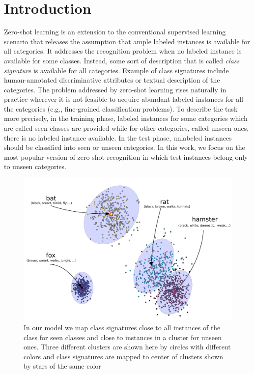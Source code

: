 \documentclass[letterpaper]{article}
\begin{document}
\section{Introduction}
Zero-shot learning \cite{bengio08,hinton09,lampert09,farhadi09} is an extension to the conventional supervised learning scenario
that releases the assumption that ample labeled instances is available for all categories. It addresses the
recognition problem when no labeled instance is available for some classes.
Instead, some sort of description that is called \textit{class signature} is available for all categories.
Example of class signatures include human-annotated discriminative attributes or textual description of the categories.
The problem addressed by zero-shot learning rises naturally in practice wherever it is not feasible to acquire abundant labeled instances for
 all the categories (e.g., fine-grained classification problems).
To describe the task more precisely, in the training phase, labeled instances for some categories which are called seen classes are provided
while for other categories, called unseen ones, there is no labeled instance available.
In the test phase, unlabeled instances should be classified into seen or unseen categories.
 In this work, we focus on the most popular version of zero-shot recognition in which test instances belong only to unseen categories.
 \begin{figure}[!t]
 \begin{center}
 \includegraphics[width=0.98\columnwidth]{overview.pdf}
 \caption{In our model we map class signatures close to all instances of the class for seen classes and close to instances in a cluster for unseen ones.
 Three different clusters are shown here by circles with different colors and class signatures are mapped to center of clusters shown by stars of the same color}
 \label{fig:overview}
 \end{center}
 \end{figure}
\end{document}
